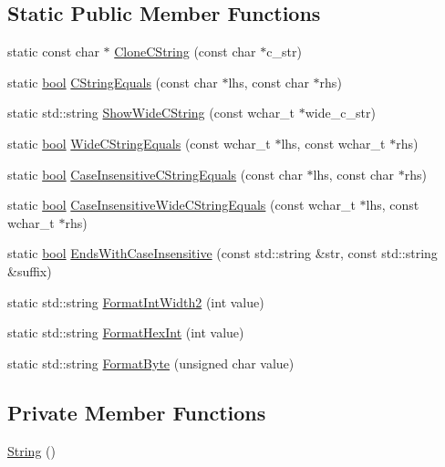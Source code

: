 \subsection*{Static Public Member Functions}
\begin{DoxyCompactItemize}
\item 
static const char $\ast$ \hyperlink{classtesting_1_1internal_1_1String_a8bce6b1281ae3d2f9061b920aa78aca0}{Clone\+C\+String} (const char $\ast$c\+\_\+str)
\item 
static \hyperlink{classbool}{bool} \hyperlink{classtesting_1_1internal_1_1String_a8bea7b33e7effbd299a0b4a5522ea96e}{C\+String\+Equals} (const char $\ast$lhs, const char $\ast$rhs)
\item 
static std\+::string \hyperlink{classtesting_1_1internal_1_1String_aaf7e376ff580677ea4954d5913d5b917}{Show\+Wide\+C\+String} (const wchar\+\_\+t $\ast$wide\+\_\+c\+\_\+str)
\item 
static \hyperlink{classbool}{bool} \hyperlink{classtesting_1_1internal_1_1String_ab0373bf6e96453d6ca0de2e68df13d3a}{Wide\+C\+String\+Equals} (const wchar\+\_\+t $\ast$lhs, const wchar\+\_\+t $\ast$rhs)
\item 
static \hyperlink{classbool}{bool} \hyperlink{classtesting_1_1internal_1_1String_a116ca435d63306927ba19f90a3596787}{Case\+Insensitive\+C\+String\+Equals} (const char $\ast$lhs, const char $\ast$rhs)
\item 
static \hyperlink{classbool}{bool} \hyperlink{classtesting_1_1internal_1_1String_a1f12d1780ca7afbf8975f5d425b9f362}{Case\+Insensitive\+Wide\+C\+String\+Equals} (const wchar\+\_\+t $\ast$lhs, const wchar\+\_\+t $\ast$rhs)
\item 
static \hyperlink{classbool}{bool} \hyperlink{classtesting_1_1internal_1_1String_a968f242b709f8c7c0ed5ecf246553321}{Ends\+With\+Case\+Insensitive} (const std\+::string \&str, const std\+::string \&suffix)
\item 
static std\+::string \hyperlink{classtesting_1_1internal_1_1String_af50b18d588355871e1982c4043523e0f}{Format\+Int\+Width2} (int value)
\item 
static std\+::string \hyperlink{classtesting_1_1internal_1_1String_affe59102e49092fc0684388e9b0c5c1e}{Format\+Hex\+Int} (int value)
\item 
static std\+::string \hyperlink{classtesting_1_1internal_1_1String_af702dc7cbd569589d8e3ff215a7cafa9}{Format\+Byte} (unsigned char value)
\end{DoxyCompactItemize}
\subsection*{Private Member Functions}
\begin{DoxyCompactItemize}
\item 
\hyperlink{classtesting_1_1internal_1_1String_a7c370de44fce74608d0b7e3dd29de035}{String} ()
\end{DoxyCompactItemize}



